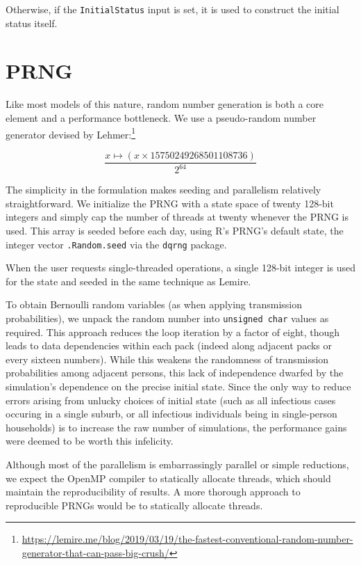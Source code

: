 \documentclass{grattan}
\newcommand*{\code}[1]{\texttt{#1}}
\begin{document}
Otherwise, if the \code{InitialStatus} input is set, it is used to construct the initial status itself.

\section{PRNG}

Like most models of this nature, random number generation is both a core element and
a performance bottleneck.  We use a pseudo-random
number generator devised by Lehmer:\footnote{\url{https://lemire.me/blog/2019/03/19/the-fastest-conventional-random-number-generator-that-can-pass-big-crush/}}

\[ \frac{x \mapsto(x \times 15750249268501108736)}{2^{64}}\]

The simplicity in the formulation makes seeding and parallelism relatively straightforward. We
initialize the PRNG with a state space of twenty 128-bit integers 
and simply cap the number of threads at twenty whenever
the PRNG is used. This array is seeded before each day, using R's PRNG's default state, the integer
vector \code{.Random.seed} via 
the \code{dqrng} package.

When the user requests single-threaded operations, a single 128-bit integer is used for 
the state and seeded in the same technique as Lemire. 

 To obtain Bernoulli random variables 
(as when applying transmission 
probabilities), we unpack the random number into \code{unsigned char} values as required. 
This approach reduces the loop iteration by a factor of eight, though leads to data dependencies
within each pack (indeed along adjacent packs or every sixteen numbers). While this weakens
the randomness of transmission probabilities among adjacent persons, this lack of
independence dwarfed by the simulation's dependence on the precise initial state. Since the only way
to reduce errors arising from unlucky choices of initial state (such as all infectious cases occuring 
in a single suburb, or all infectious individuals being in single-person households) is to increase
the raw number of simulations, the performance gains were deemed to be worth this infelicity.

Although most of the parallelism is embarrassingly parallel or simple reductions, we expect the OpenMP
compiler to statically allocate threads, which should maintain the reproducibility of results. A more
thorough approach to reproducible PRNGs would be to statically allocate threads.
\end{document}
